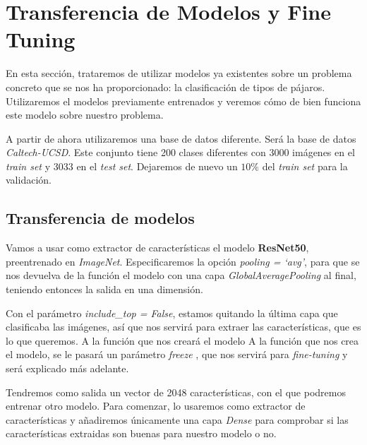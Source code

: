 \documentclass[11pt]{article}
\begin{document}
    
    
 \hypertarget{transferencia-de-modelos-y-fine-tuning}{%
\section{Transferencia de Modelos y Fine
Tuning}\label{transferencia-de-modelos-y-fine-tuning}}

En esta sección, trataremos de utilizar modelos ya existentes sobre un
problema concreto que se nos ha proporcionado: la clasificación de tipos
de pájaros. Utilizaremos el modelos previamente entrenados y veremos
cómo de bien funciona este modelo sobre nuestro problema.

A partir de ahora utilizaremos una base de datos diferente. Será la base
de datos \emph{Caltech-UCSD}. Este conjunto tiene 200 clases diferentes
con 3000 imágenes en el \emph{train set} y 3033 en el \emph{test set}.
Dejaremos de nuevo un \(10\%\) del \emph{train set} para la validación.

\hypertarget{transferencia-de-modelos}{%
\subsection{Transferencia de modelos}\label{transferencia-de-modelos}}

Vamos a usar como extractor de características el modelo
\textbf{ResNet50}, preentrenado en \emph{ImageNet}. Especificaremos la
opción \emph{pooling = `avg'}, para que se nos devuelva de la función el
modelo con una capa \emph{GlobalAveragePooling} al final, teniendo
entonces la salida en una dimensión.

Con el parámetro \emph{include\_top = False}, estamos quitando la última
capa que clasificaba las imágenes, así que nos servirá para extraer las
características, que es lo que queremos. A la función que nos creará el
modelo A la función que nos crea el modelo, se le pasará un parámetro
\emph{freeze} , que nos servirá para \emph{fine-tuning} y será explicado
más adelante.

Tendremos como salida un vector de 2048 características, con el que
podremos entrenar otro modelo. Para comenzar, lo usaremos como extractor
de características y añadiremos únicamente una capa \emph{Dense} para
comprobar si las características extraidas son buenas para nuestro
modelo o no.
\end{document}
